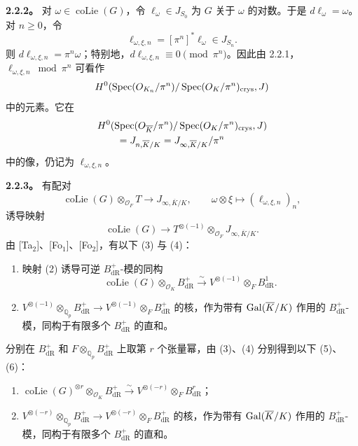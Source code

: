 \textbf{2.2.2。} 对 $\omega\in\operatorname{coLie}(G)$，令 $\ell_\omega\in J_{S_0}$ 为 $G$ 关于 $\omega$ 的对数。于是 $d\ell_\omega=\omega$。对 $n\ge0$，令
\[
 \ell_{\omega,\xi,n}=[\pi^n]^*\ell_\omega\in J_{S_n}.
\]
则 $d\ell_{\omega,\xi,n}=\pi^n\omega$；特别地，$d\ell_{\omega,\xi,n}\equiv0\pmod{\pi^n}$。因此由 2.2.1，$\ell_{\omega,\xi,n}\bmod\pi^n$ 可看作
\[
 H^0(\operatorname{Spec}(O_{K_n}/\pi^n)/\operatorname{Spec}(O_K/\pi^n)_{\mathrm{crys}},J)
\]
中的元素。它在
\begin{align*}
 &H^0(\operatorname{Spec}(O_{\overline K}/\pi^n)/\operatorname{Spec}(O_K/\pi^n)_{\mathrm{crys}},J)\\
 &\qquad=J_{n,\overline K/K}=J_{\infty,\overline K/K}/\pi^n
\end{align*}
中的像，仍记为 $\ell_{\omega,\xi,n}$。

\textbf{2.2.3。} 有配对
\begin{equation*}
 \operatorname{coLie}(G)\otimes_{\mathcal O_F}T\longrightarrow J_{\infty,\overline K/K},\qquad
 \omega\otimes\xi\longmapsto(\ell_{\omega,\xi,n})_n,\tag{1}
\end{equation*}
诱导映射
\begin{equation*}
 \operatorname{coLie}(G)\longrightarrow T^{\otimes(-1)}\otimes_{\mathcal O_F}J_{\infty,\overline K/K}.\tag{2}
\end{equation*}
由 [Ta$_2$]、[Fo$_1$]、[Fo$_2$]，有以下 (3) 与 (4)：
\begin{enumerate}[label=(\arabic*),start=3]
\item 映射 (2) 诱导可逆 $B^+_{\mathrm{dR}}$-模的同构
\[
 \operatorname{coLie}(G)\otimes_{\mathcal O_K}B^+_{\mathrm{dR}}\xrightarrow{\sim}
 V^{\otimes(-1)}\otimes_F B^1_{\mathrm{dR}}.
\]
\item $V^{\otimes(-1)}\otimes_{\mathbb Q_p}B^+_{\mathrm{dR}}\longrightarrow V^{\otimes(-1)}\otimes_F B^+_{\mathrm{dR}}$ 的核，作为带有 $\operatorname{Gal}(\overline K/K)$ 作用的 $B^+_{\mathrm{dR}}$-模，同构于有限多个 $B^+_{\mathrm{dR}}$ 的直和。
\end{enumerate}
分别在 $B^+_{\mathrm{dR}}$ 和 $F\otimes_{\mathbb Q_p}B^+_{\mathrm{dR}}$ 上取第 $r$ 个张量幂，由 (3)、(4) 分别得到以下 (5)、(6)：
\begin{enumerate}[label=(\arabic*),start=5]
\item $\operatorname{coLie}(G)^{\otimes r}\otimes_{\mathcal O_K}B^+_{\mathrm{dR}}\xrightarrow{\sim}V^{\otimes(-r)}\otimes_F B^r_{\mathrm{dR}}$；
\item $V^{\otimes(-r)}\otimes_{\mathbb Q_p}B^+_{\mathrm{dR}}\longrightarrow V^{\otimes(-r)}\otimes_F B^+_{\mathrm{dR}}$ 的核，作为带有 $\operatorname{Gal}(\overline K/K)$ 作用的 $B^+_{\mathrm{dR}}$-模，同构于有限多个 $B^+_{\mathrm{dR}}$ 的直和。
\end{enumerate}
